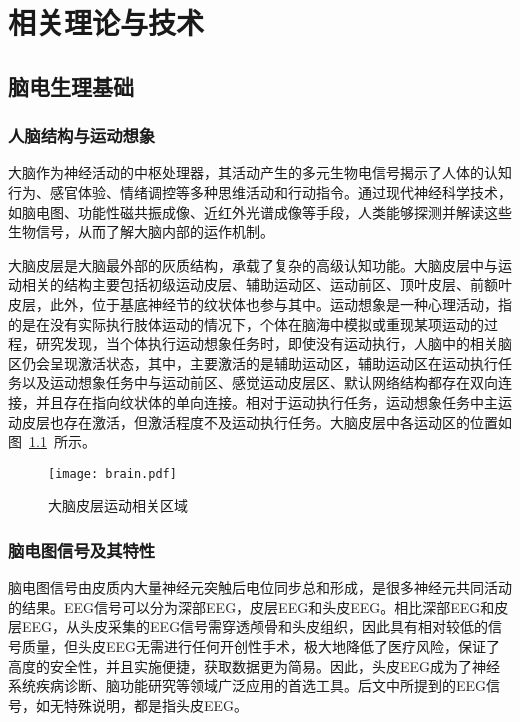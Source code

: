 
\chapter{相关理论与技术}

\section{脑电生理基础}

\subsection{人脑结构与运动想象}

大脑作为神经活动的中枢处理器，其活动产生的多元生物电信号揭示了人体的认知行为、感官体验、情绪调控等多种思维活动和行动指令。通过现代神经科学技术，如脑电图、功能性磁共振成像、近红外光谱成像等手段，人类能够探测并解读这些生物信号，从而了解大脑内部的运作机制。

大脑皮层是大脑最外部的灰质结构，承载了复杂的高级认知功能。大脑皮层中与运动相关的结构主要包括初级运动皮层、辅助运动区、运动前区、顶叶皮层、前额叶皮层\cite{ZDYS201809014}，此外，位于基底神经节的纹状体也参与其中。运动想象是一种心理活动，指的是在没有实际执行肢体运动的情况下，个体在脑海中模拟或重现某项运动的过程，研究发现，当个体执行运动想象任务时，即使没有运动执行，人脑中的相关脑区仍会呈现激活状态，其中，主要激活的是辅助运动区，辅助运动区在运动执行任务以及运动想象任务中与运动前区、感觉运动皮层区、默认网络结构都存在双向连接\cite{solodkin2004fine}，并且存在指向纹状体的单向连接\cite{watanabe2015effects}。相对于运动执行任务，运动想象任务中主运动皮层也存在激活，但激活程度不及运动执行任务\cite{solodkin2004fine,kasess2008suppressive}。大脑皮层中各运动区的位置如图~\ref{fig:brain}~所示。
\begin{figure}[ht]
    \centering
    \texttt{[image: brain.pdf]}
    \caption{大脑皮层运动相关区域\cite{penfield1950cerebral}}
    \label{fig:brain}
\end{figure}

\subsection{脑电图信号及其特性}

脑电图信号由皮质内大量神经元突触后电位同步总和形成，是很多神经元共同活动的结果\cite{ZWQX201803022}。EEG信号可以分为深部EEG，皮层EEG和头皮EEG\cite{1022779250.nh}。相比深部EEG和皮层EEG，从头皮采集的EEG信号需穿透颅骨和头皮组织，因此具有相对较低的信号质量，但头皮EEG无需进行任何开创性手术，极大地降低了医疗风险，保证了高度的安全性，并且实施便捷，获取数据更为简易。因此，头皮EEG成为了神经系统疾病诊断、脑功能研究等领域广泛应用的首选工具。后文中所提到的EEG信号，如无特殊说明，都是指头皮EEG。

